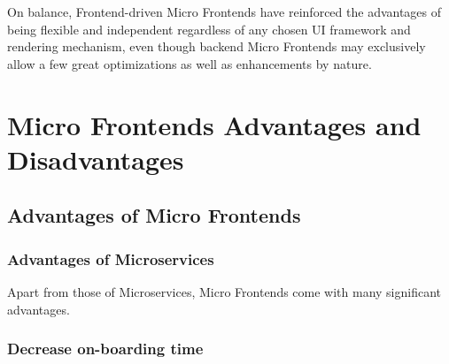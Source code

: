 \documentclass[a4paper]{book}
\begin{document}
On balance, Frontend-driven Micro Frontends have reinforced the advantages of being flexible and independent regardless of any chosen UI framework and rendering mechanism, even though backend Micro Frontends may exclusively allow a few great optimizations as well as enhancements by nature.


\chapter{Micro Frontends Advantages and Disadvantages}
\section{Advantages of Micro Frontends}
\subsection{Advantages of Microservices}
Apart from those of Microservices, Micro Frontends come with many significant advantages.

\subsection{Decrease on-boarding time}
\end{document}
